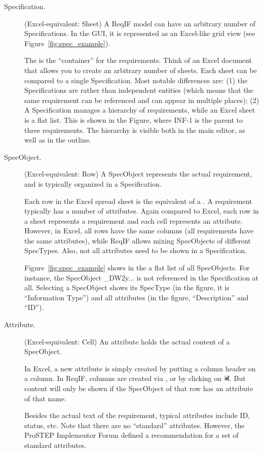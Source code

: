 \begin{description}
  \item[Specification.] (Excel-equivalent: Sheet) A ReqIF model can have an arbitrary number of Specifications. In the GUI, it is represented as an Excel-like grid view (see Figure~\ref{fig:spec_example}).

 The  is the ``container'' for the requirements.  Think of an Excel document that allows you to create an arbitrary number of sheets.  Each sheet can be compared to a single Specification.  Most notable differences are: (1) the Specifications are  rather than independent entities (which means that the same requirement can be referenced and can appear in multiple places); (2) A Specification manages a hierarchy of requirements, while an Excel sheet is a flat list.  This is shown in the Figure, where INF-1 is the parent to three requirements.  The hierarchy is visible both in the main editor, as well as in the outline.

\item[SpecObject.] (Excel-equivalent: Row) A SpecObject represents the actual requirement, and is typically organized in a Specification.

Each row in the Excel spread sheet is the equivalent of a .  A requirement typically has a number of attributes.  Again compared to Excel, each row in a sheet represents a requirement and each cell represents an attribute.  However, in Excel, all rows have the same columns (all requirements have the same attributes), while ReqIF allows mixing SpecObjects of different SpecTypes.  Also, not all attributes need to be shown in a Specification.  

Figure~\ref{fig:spec_example} shows in the  a flat list of all SpecObjects.  For instance, the SpecObject \_DW2y... is not referenced in the Specification at all.  Selecting a SpecObject shows its SpecType (in the figure, it is ``Information Type'') and all attributes (in the figure, ``Description'' and ``ID'').

  \item[Attribute.] (Excel-equivalent: Cell) An attribute holds the actual content of a SpecObject.

In Excel, a new attribute is simply created by putting a column header on a column.  In ReqIF, columns are created via , or by clicking on \includegraphics[height=0.8em]{../rmf-images/icons/full/obj16/ProRSpecViewConfiguration.png}.  But content will only be shown if the SpecObject of that row has an attribute of that name.

Besides the actual text of the requirement, typical attributes include ID, status, etc.  Note that there are no ``standard'' attributes.  However, the ProSTEP Implementor Forum defined a recommendation for a set of standard attributes.

\end{description}


